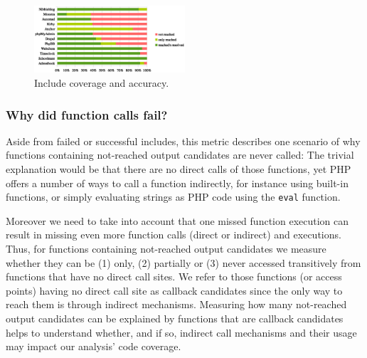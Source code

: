 \documentclass[preprint]{sig-alternate-05-2015}
\begin{document}
\begin{figure}
%				
%                

\includegraphics[width=0.5\textwidth]{images-paper/includes.eps}

    
    \caption{Include coverage and accuracy.\label{fig:include_coverage_results}}
\end{figure}

\subsubsection{Why did function calls fail?}
\label{WhyDidFunctionCallsFail}
Aside from failed or successful includes, this metric describes one scenario of why functions containing not-reached output candidates are never called: The trivial explanation would be that there are no direct calls of those functions, yet PHP offers a number of ways to call a function indirectly, for instance using built-in functions, or simply evaluating strings as PHP code using the \texttt{eval} function. 

Moreover we need to take into account that one missed function execution can result in missing even more function calls (direct or indirect) and executions. Thus, for functions containing not-reached output candidates we measure whether they can be (1) only, (2) partially or (3) never accessed transitively from functions that have no direct call sites. We refer to those functions (or access points) having no direct call site as callback candidates since the only way to reach them is through indirect mechanisms. Measuring how many not-reached output candidates can be explained by functions that are callback candidates helps to understand whether, and if so, indirect call mechanisms and their usage may impact our analysis’ code coverage.
\end{document}
